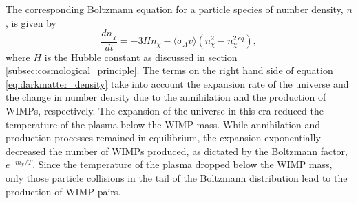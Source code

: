 The corresponding Boltzmann equation for a particle species of number density, $n$, is given by \cite{Bertone_2005}
%
\begin{equation} \label{eq:darkmatter_density}
    \frac{dn_{\chi}}{dt} = -3Hn_{\chi} - \langle \sigma_{A}v \rangle (n_{\chi}^2 - n^2_{\chi}^{eq}), 
\end{equation}
%
where $H$ is the Hubble constant as discussed in section \ref{subsec:cosmological_principle}. The terms on the right hand side of equation \ref{eq:darkmatter_density} take into account the expansion rate of the universe and the change in number density due to the annihilation and the production of WIMPs, respectively. The expansion of the universe in this era reduced the temperature of the plasma below the WIMP mass. While annihilation and production processes remained in equilibrium, the expansion exponentially decreased the number of WIMPs produced, as dictated by the Boltzmann factor, $e^{-m_{\chi}/T}$. Since the temperature of the plasma dropped below the WIMP mass, only those particle collisions in the tail of the Boltzmann distribution lead to the production of WIMP pairs. 

